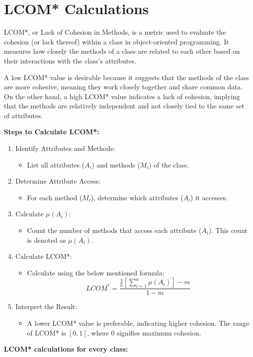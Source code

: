 \documentclass[english,12pt,a4paper]{report}
\begin{document}
	\section{LCOM* Calculations}
	LCOM*, or Lack of Cohesion in Methods, is a metric used to evaluate the cohesion (or lack thereof) within a class in object-oriented programming. It measures how closely the methods of 	a class are related to each other based on their interactions with the class's attributes.
	
	A low LCOM* value is desirable because it suggests that the methods of the class are more cohesive, meaning they work closely together and share common data. On the other hand, a high LCOM* value indicates a lack of cohesion, implying that the methods are relatively independent and not closely tied to the same set of attributes.	
	
	\vspace{10pt}
	\textbf{Steps to Calculate LCOM*:}
	
	\begin{enumerate}
		\item Identify Attributes and Methods:
		\begin{itemize}[label={$\bullet$}]
			\item List all attributes (\(A_i\)) and methods (\(M_i\)) of the class.
		\end{itemize}
		
		\item Determine Attribute Access:
		\begin{itemize}[label={$\bullet$}]
			\item For each method (\(M_i\)), determine which attributes (\(A_i\)) it accesses.
		\end{itemize}
		
		\item Calculate \(\mu(A_i)\):
		\begin{itemize}[label={$\bullet$}]
			\item Count the number of methods that access each attribute (\(A_i\)). This count is denoted as \(\mu(A_i)\).
		\end{itemize}
		
		\item Calculate LCOM*:
		\begin{itemize}[label={$\bullet$}]
			\item Calculate using the below mentioned formula:
			\begin{equation}
				LCOM^* = \frac{\frac{1}{a} \left[ \sum_{i=1}^{a} \mu(A_i) \right] - m}{1 - m}
				\tag{Equation 20}
			\end{equation}
		\end{itemize}
		
		\item Interpret the Result:
		\begin{itemize}[label={$\bullet$}]
			\item A lower LCOM* value is preferable, indicating higher cohesion. The range of LCOM* is \([0, 1]\), where 0 signifies maximum cohesion.
		\end{itemize}
	\end{enumerate}
	\vspace{10pt}
	\textbf{LCOM* calculations for every class:}
	
\end{document}
